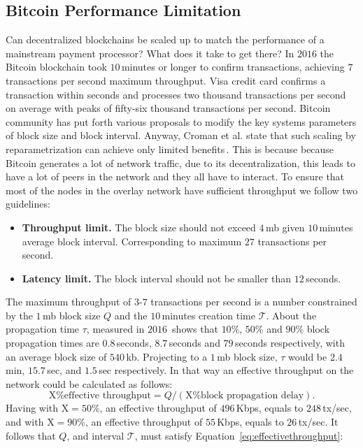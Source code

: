 \documentclass[USenglish]{uit-thesis}
\begin{document}
\subsection{Bitcoin Performance Limitation}
Can decentralized blockchains be scaled up to match the performance
of a mainstream payment processor? What does it take
to get there?
In $2016$ the Bitcoin blockchain took $10$\,minutes or longer
to confirm transactions, achieving $7$ transactions per second maximum
throughput. Visa credit card confirms a transaction within seconds
and processes two thousand transactions per second on average with peaks
of fifty-six thousand transactions per second.
Bitcoin community has put forth various proposals to modify
the key systems parameters of block size and block interval.
Anyway, Croman et al. state that such scaling by reparametrization
can achieve only limited benefits\,\cite{croman2016}.
This is because because Bitcoin
generates a lot of network traffic, due to its
decentralization, this leads to have a lot of peers in the network
and they all have to interact. To ensure that most
of the nodes in the overlay network have sufficient
throughput we follow two guidelines:
\begin{itemize}[noitemsep]
	\item \textbf{Throughput limit.} The block size should not exceed $4$\,\gls{mb}
	given $10$\,minutes average block interval. Corresponding to maximum
	$27$ transactions per second.
	\item \textbf{Latency limit.} The block interval should not be smaller
	than $12$\,seconds.
\end{itemize}
The maximum throughput of $3$-$7$ transactions per second is
a number constrained by the $1$\,\gls{mb} block size $Q$ and the
$10$\,minutes creation time $\mathcal{T}$.
About the propagation time $\tau$, measured
in $2016$\,\cite{croman2016} shows that
$10\%$, $50\%$ and $90\%$ block
propagation times are $0.8$\,seconds,
$8.7$\,seconds and $79$\,seconds respectively,
with an average block size of $540$\,\gls{kb}.
Projecting to a $1$\,\gls{mb} block size, $\tau$
would be $2.4$\,min, $15.7$\,sec, and $1.5$\,sec respectively.
In that way an effective throughput on the network
could be calculated as follows:
\[
\text{X\% effective throughput} = Q / (\text{X\% block propagation delay}).
\]
Having with $\text{X} = 50\%$, an effective throughput of $496$\,Kbps,
equals to $248$\,tx/sec, and with $\text{X} = 90\%$, an effective throughput
of $55$\,Kbps, equals to $26$\,tx/sec.
It follows that $Q$, and interval $\mathcal{T}$,
must satisfy Equation~\ref{eq:effectivethroughput}:
\end{document}
